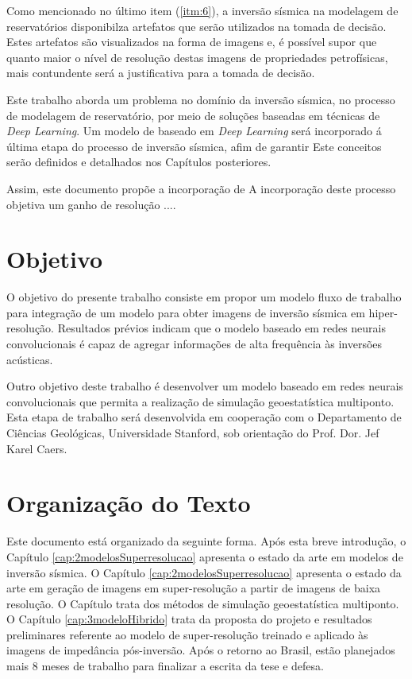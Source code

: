 Como mencionado no último item (\ref{itm:6}), a inversão sísmica na modelagem de reservatórios disponibilza
artefatos que serão utilizados na tomada de decisão. Estes artefatos são visualizados na forma de imagens
e, é possível supor que quanto maior o nível de resolução destas imagens de propriedades petrofísicas,
mais contundente será a justificativa para a tomada de decisão.

Este trabalho aborda um problema no domínio da inversão sísmica,
no processo de modelagem de reservatório, por meio de soluções baseadas em técnicas de \textit{Deep Learning}.
Um modelo de baseado em \textit{Deep Learning} será incorporado á última etapa do processo de inversão sísmica,
afim de garantir 
Este conceitos serão definidos e detalhados nos Capítulos posteriores.

Assim, este documento propõe a incorporação de
A incorporação deste processo objetiva um ganho de resolução ....


\section{Objetivo}

O objetivo do presente trabalho consiste em propor um modelo fluxo de trabalho
para integração de um modelo para obter imagens de inversão sísmica em hiper-resolução.
Resultados prévios indicam que o modelo baseado em redes neurais convolucionais é capaz
de agregar informações de alta frequência às inversões acústicas.

Outro objetivo deste trabalho é desenvolver um modelo baseado em redes neurais convolucionais que permita a
realização de simulação geoestatística multiponto. Esta etapa de trabalho será desenvolvida
em cooperação com o Departamento de Ciências Geológicas, Universidade Stanford, sob
orientação do Prof. Dor. Jef Karel Caers.


\section{Organização do Texto}

Este documento está organizado da seguinte forma. Após esta breve introdução, o
Capítulo \ref{cap:2modelosSuperresolucao} apresenta o estado da arte em modelos de
inversão sísmica. O Capítulo \ref{cap:2modelosSuperresolucao} apresenta o estado da arte 
em geração de imagens em super-resolução a partir de imagens de baixa resolução.
O Capítulo trata dos métodos de simulação geoestatística multiponto. O
Capítulo \ref{cap:3modeloHibrido} trata da proposta do projeto e resultados
preliminares referente ao modelo de super-resolução treinado e aplicado às imagens
de impedância pós-inversão. Após o retorno ao Brasil, estão planejados mais 8 meses
de trabalho para finalizar a escrita da tese e defesa.